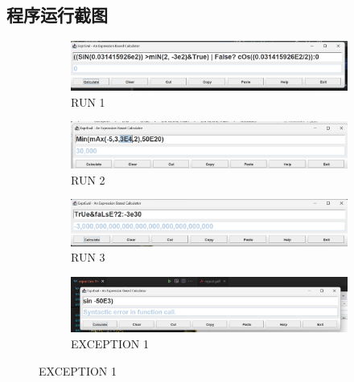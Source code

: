 \documentclass{article}
\begin{document}
\subsection{程序运行截图}
\begin{figure}[htbp]
    \centering
    \begin{subfigure}[b]{0.9\textwidth}
        \centering
        \includegraphics[width=\linewidth]{image24.png}
        \caption{RUN 1}
        \label{fig:image24}
    \end{subfigure}
    \hfill
    \begin{subfigure}[b]{0.9\textwidth}
        \centering
        \includegraphics[width=\linewidth]{image25.png}
        \caption{RUN 2}
        \label{fig:image25}
    \end{subfigure}
    
    \begin{subfigure}[b]{0.9\textwidth}
        \centering
        \includegraphics[width=\linewidth]{image26.png}
        \caption{RUN 3}
        \label{fig:image26}
    \end{subfigure}
    \hfill
    \begin{subfigure}[b]{0.9\textwidth}
        \centering
        \includegraphics[width=\linewidth]{image27.png}
        \caption{EXCEPTION 1}
        \label{fig:image27}
    \end{subfigure}
    

\end{figure}
\end{document}
